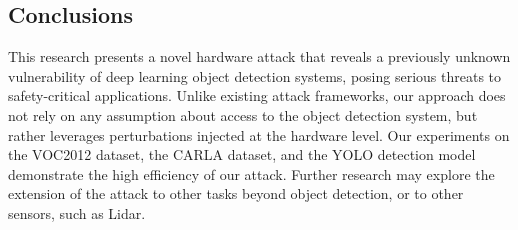
\subsection{Conclusions}


This research presents a novel hardware attack that reveals a previously unknown vulnerability of deep learning object detection systems, posing serious threats to safety-critical applications. Unlike existing attack frameworks, our approach does not rely on any assumption about access to the object detection system, but rather leverages perturbations injected at the hardware level. Our experiments on the VOC2012 dataset, the CARLA dataset, and the YOLO detection model demonstrate the high efficiency of our attack. Further research may explore the extension of the attack to other tasks beyond object detection, or to other sensors, such as Lidar.







